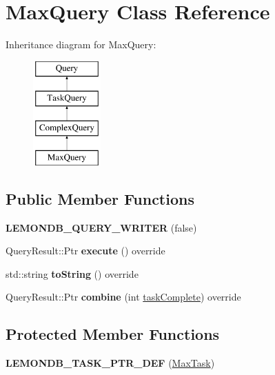 \hypertarget{class_max_query}{}\section{Max\+Query Class Reference}
\label{class_max_query}
Inheritance diagram for Max\+Query\+:\begin{figure}[H]
\begin{center}
\leavevmode
\includegraphics[height=4.000000cm]{class_max_query}
\end{center}
\end{figure}
\subsection*{Public Member Functions}
\begin{DoxyCompactItemize}
\item 
\mbox{\label{class_max_query_ac4c1bcca03006eb0dd82cdbbdb6bcbca}} 
{\bfseries L\+E\+M\+O\+N\+D\+B\+\_\+\+Q\+U\+E\+R\+Y\+\_\+\+W\+R\+I\+T\+ER} (false)
\item 
\mbox{\label{class_max_query_a103a8275e8dbdeba69c3982764602e27}} 
Query\+Result\+::\+Ptr {\bfseries execute} () override
\item 
\mbox{\label{class_max_query_a03ed2db98d4260ee71341a7bddd88dae}} 
std\+::string {\bfseries to\+String} () override
\item 
\mbox{\label{class_max_query_a5f6af6472916bf2d1c35bec15a5a70a7}} 
Query\+Result\+::\+Ptr {\bfseries combine} (int \hyperlink{class_task_query_a3dc3e4c56ddea8ff025239fd9da358d3}{task\+Complete}) override
\end{DoxyCompactItemize}
\subsection*{Protected Member Functions}
\begin{DoxyCompactItemize}
\item 
\mbox{\label{class_max_query_a6b7a679b81b0b45571b3f30c850306ba}} 
{\bfseries L\+E\+M\+O\+N\+D\+B\+\_\+\+T\+A\+S\+K\+\_\+\+P\+T\+R\+\_\+\+D\+EF} (\hyperlink{class_max_task}{Max\+Task})
\end{DoxyCompactItemize}
